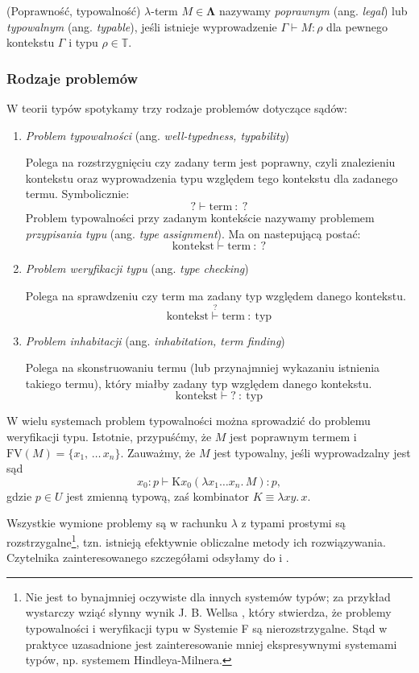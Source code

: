 \begin{definicja}(Poprawność, typowalność)
  \(\lambda\)-term \(M\in\mathbf{\Lambda}\) nazywamy \emph{poprawnym} (ang. \emph{legal}) lub \emph{typowalnym} (ang. \emph{typable}), jeśli istnieje wyprowadzenie \(\Gamma\vdash M:\rho\) dla pewnego kontekstu \(\Gamma\) i typu \(\rho\in\mathbb{T}\). 
\end{definicja}

\subsubsection{Rodzaje problemów} 
W teorii typów spotykamy trzy rodzaje problemów dotyczące sądów:
\begin{enumerate}
  \setlength\itemsep{0em}
  \item \emph{Problem typowalności} (ang. \emph{well-typedness, typability})

    Polega na rozstrzygnięciu czy zadany term jest poprawny, czyli znalezieniu kontekstu oraz wyprowadzenia typu względem tego kontekstu dla zadanego termu. Symbolicznie:
    \[ \mathbf{?} \vdash \text{term}\ :\ \mathbf{?} \]
    Problem typowalności przy zadanym kontekście nazywamy problemem \emph{przypisania typu} (ang. \emph{type assignment}). Ma on nastepującą postać: 
    \[ \text{kontekst} \vdash \text{term}\ :\ \mathbf{?} \]
  \item \emph{Problem weryfikacji typu} (ang. \emph{type checking}) 
    
    Polega na sprawdzeniu czy term ma zadany typ względem danego kontekstu.
    \[ \text{kontekst} \stackrel{\mathbf{?}}{\vdash} \text{term}\ :\ \text{typ} \]
  \item \emph{Problem inhabitacji} (ang. \emph{inhabitation, term finding})

    Polega na skonstruowaniu termu (lub przynajmniej wykazaniu istnienia takiego termu), który    miałby zadany typ względem danego kontekstu. 
    \[
      \text{kontekst} \vdash \mathbf{?}\ :\ \text{typ}
    \]
\end{enumerate}

W wielu systemach problem typowalności można sprowadzić do problemu weryfikacji typu. Istotnie, przypuśćmy, że \(M\) jest poprawnym termem i \(\mathrm{FV}(M)=\{x_1,\,\dots\,x_n\}\). Zauważmy, że \(M\) jest typowalny, jeśli wyprowadzalny jest sąd
\[
  x_0:p\vdash \mathrm{K} x_0 (\lambda x_1 \dots x_n.\,M):p,
\]
gdzie \(p\in U\) jest zmienną typową, zaś kombinator \(K\equiv \lambda xy.\,x\).

Wszystkie wymione problemy są w rachunku \(\lambda\) z typami prostymi są rozstrzygalne\footnote{Nie jest to bynajmniej oczywiste dla innych systemów typów; za przykład wystarczy wziąć słynny wynik J. B. Wellsa \cite{Wells_98}, który stwierdza, że  problemy typowalności i weryfikacji typu w Systemie F są nierozstrzygalne. Stąd w praktyce uzasadnione jest zainteresowanie mniej ekspresywnymi systemami typów, np. systemem Hindleya-Milnera.}, tzn. istnieją efektywnie obliczalne metody ich rozwiązywania. Czytelnika zainteresowanego szczegółami odsyłamy do \cite[Twierdzenie 3.2.7]{Urzyczyn2006} i \cite[Rozdział 4.4]{Barendregt_1992}.

